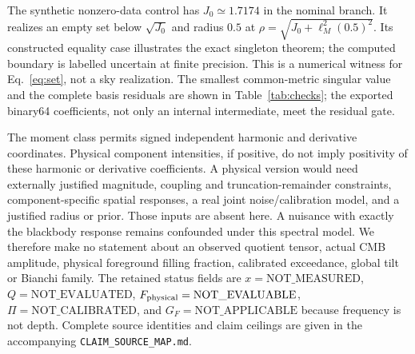\documentclass[aps,prd,onecolumn,11pt,nofootinbib,notitlepage]{revtex4-2}
\begin{document}
\begin{table}[t]
\caption{Smallest resolved singular value, relative $Fc=a$ residuals under both declared metrics, and largest relative full-tensor basis-action residual $\max_j\epsilon_j$ for the common-metric compensator. The residual gate is $10^{-10}$ for $Fc=a$ and $10^{-9}$ for the complete tensor actions.}
\label{tab:checks}
\centering
\end{table}

The synthetic nonzero-data control has $J_0\simeq1.7174$ in the nominal branch. It realizes an empty set below $\sqrt{J_0}$ and radius $0.5$ at $\rho=\sqrt{J_0+\ell_M^2(0.5)^2}$. Its constructed equality case illustrates the exact singleton theorem; the computed boundary is labelled uncertain at finite precision. This is a numerical witness for Eq.~\eqref{eq:set}, not a sky realization. The smallest common-metric singular value and the complete basis residuals are shown in Table~\ref{tab:checks}; the exported binary64 coefficients, not only an internal intermediate, meet the residual gate.

The moment class permits signed independent harmonic and derivative coordinates. Physical component intensities, if positive, do not imply positivity of these harmonic or derivative coefficients. A physical version would need externally justified magnitude, coupling and truncation-remainder constraints, component-specific spatial responses, a real joint noise/calibration model, and a justified radius or prior. Those inputs are absent here. A nuisance with exactly the blackbody response remains confounded under this spectral model. We therefore make no statement about an observed quotient tensor, actual CMB amplitude, physical foreground filling fraction, calibrated exceedance, global tilt or Bianchi family. The retained status fields are $x=\mathrm{NOT\_MEASURED}$, $Q=\mathrm{NOT\_EVALUATED}$, $F_{\rm physical}=\mathrm{NOT\_EVALUABLE}$, $\Pi=\mathrm{NOT\_CALIBRATED}$, and $G_F=\mathrm{NOT\_APPLICABLE}$ because frequency is not depth. Complete source identities and claim ceilings are given in the accompanying \texttt{CLAIM\_SOURCE\_MAP.md}.
\end{document}

